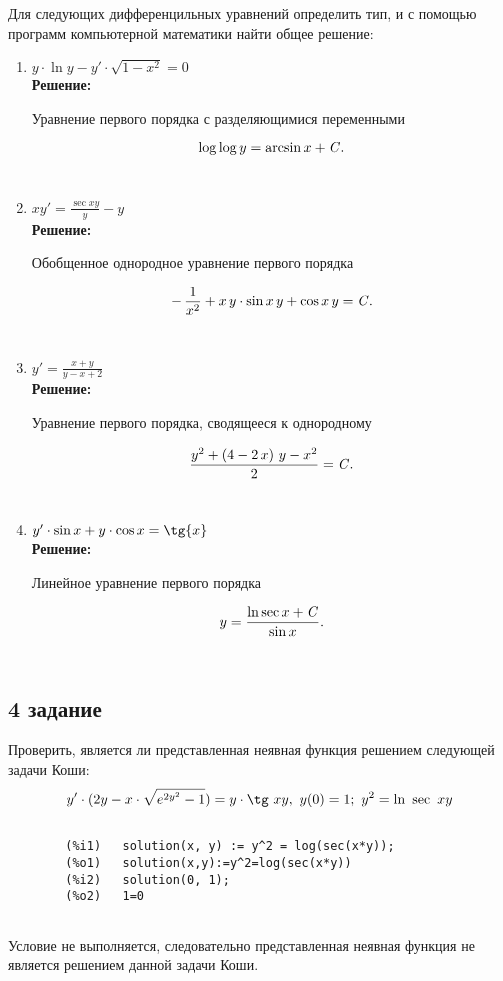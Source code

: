 \documentclass[14pt, a4paper, titlepage, fleqn]{extarticle}
\begin{document}
    Для следующих дифференцильных уравнений определить тип, и с помощью программ компьютерной математики найти общее решение:
    
    \begin{enumerate}
    	
    	\item $y \cdot \ln{y}-y'\cdot \sqrt{1-x^2} = 0$\\  
    	
    	\textbf{Решение:} 
    	
    	Уравнение первого порядка с разделяющимися переменными 
    	
    	\[\log \log y=\arcsin x+{\it C.}\]\\
    	
    	
    	\item $xy' = \displaystyle \frac{\sec{xy}}{y} - y$ \\
    	
    	\textbf{Решение:} 
    	
    	Обобщенное однородное уравнение первого порядка    
    	
    	\[-\, \frac{1}{x^{2}} + x\,y \cdot \sin{x\,y} + \cos{x\,y} = {\it C.}  \]	\\	
    	
    	\item $y'=\displaystyle\frac{x+y}{y-x+2}$\\
    	
    	\textbf{Решение:} 
    	
    	Уравнение первого порядка, сводящееся к однородному 
    	
    	\[{{y^2+\left(4-2\,x\right)\,y-x^2}\over{2}}={\it C.}\]\\
    	\item $y'\cdot\sin{x} + y \cdot \cos{x} = \tg{x}$ \\
    	
    	\textbf{Решение:} 
    	
    	Линейное уравнение первого порядка 
    	
    	\[y={{\ln{\sec{x}}+{\it C}}\over{\sin x}}.\]\\
    	
    \end{enumerate}

    \subsection*{4 задание}
    Проверить, является ли представленная неявная функция решением следующей задачи Коши:
    \[y' \cdot (2y - x \cdot \sqrt{e^{2y^{2}}-1}) = y \cdot \tg~xy,~ y(0) = 1; ~ y^2 = \ln~\sec~xy\]
    
    \begin{verbatim}
    
        (%i1)	solution(x, y) := y^2 = log(sec(x*y));
        (%o1)	solution(x,y):=y^2=log(sec(x*y))
        (%i2)	solution(0, 1);
        (%o2)	1=0
        
    \end{verbatim}
    
	Условие не выполняется, следовательно представленная неявная функция не является решением данной задачи Коши.
    
\end{document}
